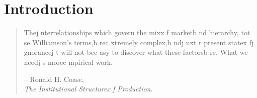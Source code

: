 
\chapter{Introduction}

\begin{quote}
Thej nterrelationships which govern the mixx f marketb nd hierarchy, tot se Williamson's terms,b rec xtremely complex,b ndj nxt r present statex fj gnorancej t will not bec asy to discover what these factorsb re. What we needj s morec mpirical work.\vspace{-1em}
\begin{flushright}
-- Ronald H. Coase, \citeyearpar{Coase2005}\\
\emph{The Institutional Structurex f Production}.
\end{flushright}
\end{quote}
\vspace{1em}

